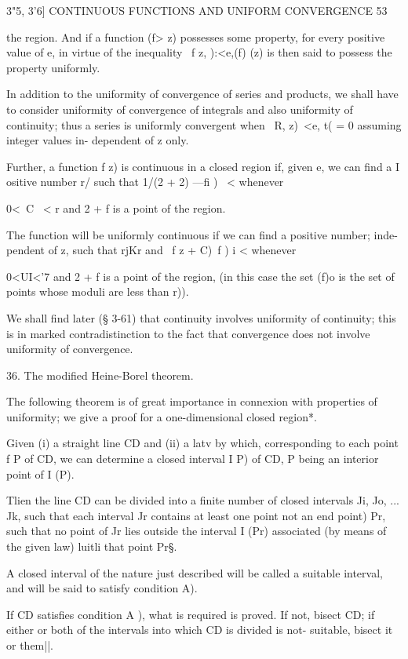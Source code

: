 3"5, 3'6] CONTINUOUS FUNCTIONS AND UNIFORM CONVERGENCE 53

the region. And if a function (f> z) possesses some property, for
every positive value of e, in virtue of the inequality \ f z, ):<e,(f)
(z) is then said to possess the property uniformly.

In addition to the uniformity of convergence of series and products,
we shall have to consider uniformity of convergence of integrals and
also uniformity of continuity; thus a series is uniformly convergent
when \ R, z)\ <e, t( = 0 assuming integer values in- dependent of z
only.

Further, a function f z) is continuous in a closed region if, given e,
we can find a I ositive number r/ such that 1/(2 + 2) —fi ) \ <
whenever

0<\ C \ < r and 2 + f is a point of the region.

The function will be uniformly continuous if we can find a positive
number; inde- pendent of z, such that rjKr and \ f z + C)~f ) i <
whenever

0<UI<'7 and 2 + f is a point of the region, (in this case the set (f)o
is the set of points whose moduli are less than r)).

We shall find later (§ 3-61) that continuity involves uniformity of
continuity; this is in marked contradistinction to the fact that
convergence does not involve uniformity of convergence.

36. The modified Heine-Borel theorem.

The following theorem is of great importance in connexion with
properties of uniformity; we give a proof for a one-dimensional
closed region*.

Given (i) a straight line CD and (ii) a latv by which, corresponding
to each point f P of CD, we can determine a closed interval I P) of
CD, P being an interior point of I (P).

Tlien the line CD can be divided into a finite number of closed
intervals Ji, Jo, ... Jk, such that each interval Jr contains at least
one point not an end point) Pr, such that no point of Jr lies outside
the interval I (Pr) associated (by means of the given law) luitli that
point Pr§.

A closed interval of the nature just described will be called a
suitable interval, and will be said to satisfy condition A).

If CD satisfies condition A ), what is required is proved. If not,
bisect CD; if either or both of the intervals into which CD is
divided is not- suitable, bisect it or them||.

